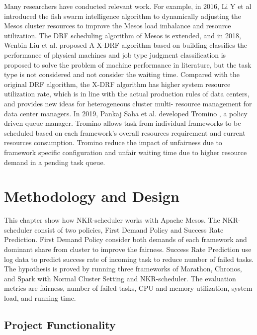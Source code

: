 \documentclass[12pt,oneside,openright,a4paper]{cpe-english-project}
\begin{document}
\hspace{10mm}Many researchers have conducted relevant work. For example, in 2016, Li Y et al \cite{fishSwarm} introduced the fish swarm intelligence algorithm to dynamically adjusting the Mesos cluster resources to improve the Mesos load imbalance and resource utilization. The DRF scheduling algorithm of Mesos is extended, and in 2018, Wenbin Liu et al. proposed A X-DRF algorithm \cite{xdrf} based on building classifies the performance of physical machines and job type judgment classification is proposed to solve the problem of machine performance in literature, but the task type is not considered and not consider the waiting time. Compared with the original DRF algorithm, the X-DRF algorithm has higher system resource utilization rate, which is in line with the actual production rules of data centers, and provides new ideas for heterogeneous cluster multi- resource management for data center managers. In 2019, Pankaj Saha et al. developed Tromino \cite{tromino}, a policy driven queue manager. Tromino allows task from individual frameworks to be scheduled based on each framework’s overall resources requirement and current resources consumption. Tromino reduce the impact of unfairness due to framework specific configuration and unfair waiting time due to higher resource demand in a pending task queue.

\chapter{Methodology and Design}

\hspace{10mm}This chapter show how NKR-scheduler works with Apache Mesos. The NKR-scheduler consist of two policies, First Demand Policy and Success Rate Prediction. First Demand Policy consider both demands of each framework and dominant share from cluster to improve the fairness. Success Rate Prediction use log data to predict success rate of incoming task to reduce number of failed tasks. The hypothesis is proved by running three frameworks of Marathon, Chronos, and Spark with Normal Cluster Setting and NKR-scheduler. The evaluation metrics are fairness, number of failed tasks, CPU and memory utilization, system load, and running time.

\section{Project Functionality}
\end{document}
